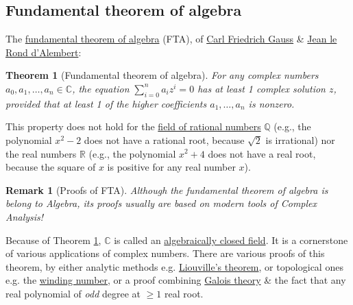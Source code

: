 \documentclass{article}
\newtheorem{remark}{Remark}
\newtheorem{theorem}{Theorem}
\begin{document}
\subsection{Fundamental theorem of algebra}
The \href{https://en.wikipedia.org/wiki/Fundamental_theorem_of_algebra}{fundamental theorem of algebra} (FTA), of \href{https://en.wikipedia.org/wiki/Carl_Friedrich_Gauss}{\sc Carl Friedrich Gauss} \& \href{https://en.wikipedia.org/wiki/Jean_le_Rond_d%27Alembert}{Jean le Rond d'Alembert}:

\begin{theorem}[Fundamental theorem of algebra]
	\label{thm: FTA}
	For any complex numbers $a_0,a_1,\ldots,a_n\in\mathbb{C}$, the equation $\sum_{i=0}^n a_iz^i = 0$ has at least 1 complex solution $z$, provided that at least 1 of the higher coefficients $a_1,\ldots,a_n$ is nonzero.
\end{theorem}
This property does not hold for the \href{https://en.wikipedia.org/wiki/Rational_number}{field of rational numbers} $\mathbb{Q}$ (e.g., the polynomial $x^2 - 2$ does not have a rational root, because $\sqrt{2}$ is irrational) nor the real numbers $\mathbb{R}$ (e.g., the polynomial $x^2 + 4$ does not have a real root, because the square of $x$ is positive for any real number $x$).

\begin{remark}[Proofs of FTA]
	Although the fundamental theorem of algebra is belong to Algebra, its proofs usually are based on modern tools of Complex Analysis!
\end{remark}
Because of Theorem \ref{thm: FTA}, $\mathbb{C}$ is called an \href{https://en.wikipedia.org/wiki/Algebraically_closed_field}{algebraically closed field}. It is a cornerstone of various applications of complex numbers. There are various proofs of this theorem, by either analytic methods e.g. \href{https://en.wikipedia.org/wiki/Liouville%27s_theorem_(complex_analysis)}{Liouville's theorem}, or topological ones e.g. the \href{https://en.wikipedia.org/wiki/Winding_number}{winding number}, or a proof combining \href{https://en.wikipedia.org/wiki/Galois_theory}{Galois theory} \& the fact that any real polynomial of {\it odd} degree at $\ge1$ real root.

\end{document}
